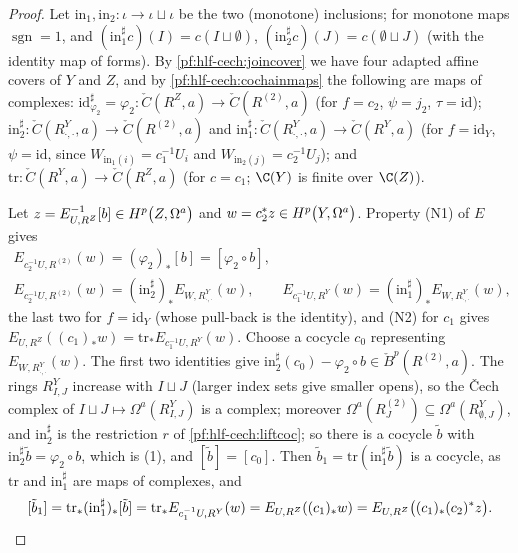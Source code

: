 \begin{proof}
Let $\mathrm{in}_1,\mathrm{in}_2\colon\iota\to\iota\sqcup\iota$ be the two (monotone) inclusions; for monotone maps $\operatorname{sgn}=1$, and
$(\mathrm{in}_1^\sharp c)(I)=c(I\sqcup\emptyset)$, $(\mathrm{in}_2^\sharp c)(J)=c(\emptyset\sqcup J)$ (with the identity map of forms). By
\cref{pf:hlf-cech:joincover} we have four adapted affine covers of $Y$ and $Z$, and by \cref{pf:hlf-cech:cochainmaps} the following are maps of
complexes: $\mathrm{id}^\sharp_{\varphi_2}=\varphi_2\colon\check C(R^Z,a)\to\check C(R^{(2)},a)$ (for $f=c_2$, $\psi=j_2$, $\tau=\mathrm{id}$);
$\mathrm{in}_2^\sharp\colon\check C(R^Y_{\cdot,\cdot},a)\to\check C(R^{(2)},a)$ and $\mathrm{in}_1^\sharp\colon\check C(R^Y_{\cdot,\cdot},a)\to\check C(R^Y,a)$
(for $f=\mathrm{id}_Y$, $\psi=\mathrm{id}$, since $W_{\mathrm{in}_1(i)}=c_1^{-1}U_i$ and $W_{\mathrm{in}_2(j)}=c_2^{-1}U_j$); and
$\mathrm{tr}\colon\check C(R^Y,a)\to\check C(R^Z,a)$ (for $c=c_1$; $\C(Y)$ is finite over $\C(Z)$).

Let $z=E_{U,R^Z}^{-1}[b]\in\hlfcechHdg{Z}{a}{p}$ and $w=c_2^*z\in\hlfcechHdg{Y}{a}{p}$. Property (N1) of $E$ gives
\begin{gather*}
  E_{c_2^{-1}U,R^{(2)}}(w)=(\varphi_2)_*[b]=[\varphi_2\circ b],\\
  E_{c_2^{-1}U,R^{(2)}}(w)=(\mathrm{in}_2^\sharp)_*E_{W,R^Y_{\cdot,\cdot}}(w),\qquad
  E_{c_1^{-1}U,R^Y}(w)=(\mathrm{in}_1^\sharp)_*E_{W,R^Y_{\cdot,\cdot}}(w),
\end{gather*}
the last two for $f=\mathrm{id}_Y$ (whose pull-back is the identity), and (N2) for $c_1$ gives
$E_{U,R^Z}((c_1)_*w)=\mathrm{tr}_*E_{c_1^{-1}U,R^Y}(w)$. Choose a cocycle $c_0$ representing $E_{W,R^Y_{\cdot,\cdot}}(w)$. The first two identities
give $\mathrm{in}_2^\sharp(c_0)-\varphi_2\circ b\in\check B^p(R^{(2)},a)$. The rings $R^Y_{I,J}$ increase with $I\sqcup J$ (larger index sets give smaller
opens), so the \v{C}ech complex of $I\sqcup J\mapsto\Omega^a(R^Y_{I,J})$ is a complex; moreover $\Omega^a(R^{(2)}_J)\subseteq\Omega^a(R^Y_{\emptyset,J})$, and $\mathrm{in}_2^\sharp$ is the restriction $r$ of \cref{pf:hlf-cech:liftcoc};
so there is a cocycle $\tilde b$ with $\mathrm{in}_2^\sharp\tilde b=\varphi_2\circ b$, which is (1), and $[\tilde b]=[c_0]$. Then
$\tilde b_1=\mathrm{tr}(\mathrm{in}_1^\sharp\tilde b)$ is a cocycle, as $\mathrm{tr}$ and $\mathrm{in}_1^\sharp$ are maps of complexes, and
\[
  [\tilde b_1]=\mathrm{tr}_*(\mathrm{in}_1^\sharp)_*[\tilde b]=\mathrm{tr}_*E_{c_1^{-1}U,R^Y}(w)=E_{U,R^Z}((c_1)_*w)=E_{U,R^Z}\bigl((c_1)_*(c_2)^*z\bigr).\qedhere
\]
\end{proof}

